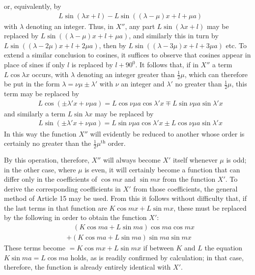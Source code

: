 or, equivalently, by
\[
\begin{aligned}
&L\sin(\lambda x+l)-L\sin((\lambda-\mu)x+l+\mu a)
\end{aligned}
\]
with $\lambda$ denoting an integer. Thus, in $X''$, any part $L\sin(\lambda x+l)$ may be replaced by $L\sin((\lambda-\mu)x+l+\mu a)$, and similarly this in turn by
$L\sin((\lambda-2\mu)x+l+2\mu a)$, then by $L\sin((\lambda-3\mu)x+l+3\mu a)$ etc. To extend a similar conclusion to cosines, it suffices to observe that cosines appear in place of sines
if only $l$ is replaced by $l+90^{0}$. It follows that, if in $X''$ a term
$L\cos\lambda x$ occurs, with $\lambda$ denoting an integer greater than $\frac12\mu$, which can therefore be put in the form
$\lambda=\nu\mu\pm\lambda'$ with $\nu$ an integer and $\lambda'$ no greater than $\frac12\mu$, this term may be replaced by
\[
\begin{aligned}
&L\cos(\pm\lambda'x+\nu\mu a)=L\cos\nu\mu a\cos\lambda'x\mp L\sin\nu\mu a\sin\lambda'x
\end{aligned}
\]
and similarly a term $L\sin\lambda x$ may be replaced by
\[
\begin{aligned}
&L\sin(\pm\lambda'x+\nu\mu a)=L\sin\nu\mu a\cos\lambda'x\pm L\cos\nu\mu a\sin\lambda'x
\end{aligned}
\]
In this way the function $X''$ will evidently be reduced to another whose order is certainly no greater
than the $\frac12\mu^{\mathrm{th}}$ order.

By this operation, therefore, $X''$ will always become $X'$ itself whenever $\mu$
is odd; in the other case, where $\mu$ is even, it will certainly become a function that
can differ only in the coefficients of $\cos mx$ and $\sin mx$ from the function $X'$.
To derive the corresponding coefficients in $X'$ from those coefficients, the general method of Article 15 may be used. From this it follows without difficulty that, if
the last terms in that function are $K\cos mx+L\sin mx$, these must be replaced by the following in order to obtain the function $X'$:
\[
\begin{aligned}
&\quad(K\cos ma+L\sin ma)\cos ma\cos mx\\[5pt]
&+(K\cos ma+L\sin ma)\sin ma\sin mx
\end{aligned}
\]
These terms become $=K\cos mx+L\sin mx$ if between $K$ and $L$ the equation $K\sin ma=L\cos ma$
holds, as is readily confirmed by calculation; in that case, therefore, the function is already entirely identical with $X'$.
\endgroup
